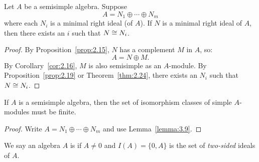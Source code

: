 \begin{lemma}\label{lemma:3.9}
Let $A$ be a semisimple algebra. Suppose
\begin{equation}
A=N_{1}\oplus\cdots\oplus N_{m}
\end{equation}
where each $N_{i}$ is a minimal right ideal (of $A$). If $N$ is a
minimal right ideal of $A$, then there exists an $i$ such that $N\cong N_{i}$.
\end{lemma}

\begin{proof}
By Proposition~\ref{prop:2.15}, $N$ has a complement $M$ in $A$, so:
\begin{equation}
A=N\oplus M.
\end{equation}
By Corollary~\ref{cor:2.16}, $M$ is also semisimple as an $A$-module.
By Proposition~\ref{prop:2.19} or Theorem~\ref{thm:2.24}, there exists
an $N_{i}$ such that $N\cong N_{i}$.
\end{proof}

\begin{corollary}\label{cor:3.10}
If $A$ is a semisimple algebra, then the set of isomorphism classes of
simple $A$-modules must be finite.
\end{corollary}

\begin{proof}
Write $A=N_{1}\oplus\cdots\oplus N_{m}$ and use Lemma~\ref{lemma:3.9}.
\end{proof}

\begin{definition}
We say an algebra $A$ is  if $A\neq0$ and $I(A)=\{0,A\}$
is the set of \emph{two-sided} ideals of $A$.
\end{definition}